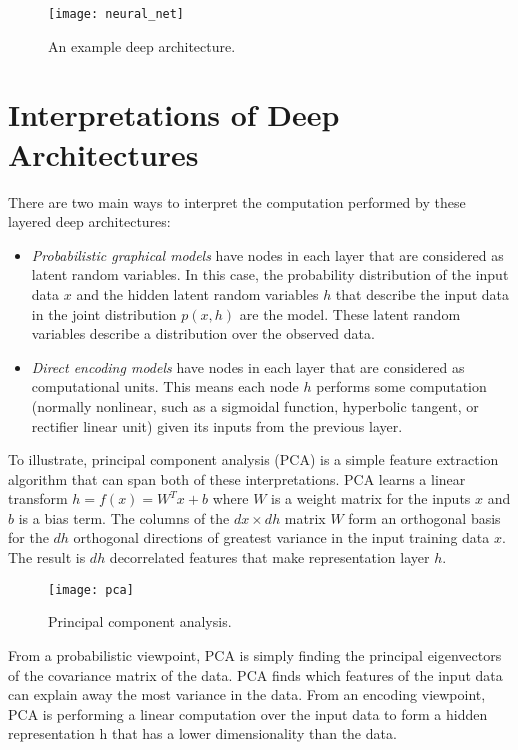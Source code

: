 \begin{figure}[h!]
  \centering
    \texttt{[image: neural\_net]}
\caption{An example deep architecture.}
\end{figure}

\section{Interpretations of Deep Architectures}
There are two main ways to interpret the computation performed by these layered deep architectures:

\begin{itemize}
\item \emph{Probabilistic graphical models} have nodes in each layer that are considered as latent random variables. In this case, the probability distribution of the input data \(x\) and the hidden latent random variables \(h\) that describe the input data in the joint distribution \(p(x,h)\) are the model. These latent random variables describe a distribution over the observed data.
\item \emph{Direct encoding models} have nodes in each layer that are considered as computational units. This means each node \(h\) performs some computation (normally nonlinear, such as a sigmoidal function, hyperbolic tangent, or rectifier linear unit) given its inputs from the previous layer.
\end{itemize}

To illustrate, principal component analysis (PCA) is a simple feature extraction algorithm that can span both of these interpretations. PCA learns a linear transform \(h = f(x) = W^T x + b\) where \(W\) is a weight matrix for the inputs \(x\) and \(b\) is a bias term. The columns of the \(dx \times dh\) matrix \(W\) form an orthogonal basis for the \(dh\) orthogonal directions of greatest variance in the input training data \(x\). The result is \(dh\) decorrelated features that make representation layer \(h\). 

\begin{figure}[h!]
  \centering
    \texttt{[image: pca]}
\caption[PCA]{Principal component analysis\footnotemark{}.}
\end{figure}

From a probabilistic viewpoint, PCA is simply finding the principal eigenvectors of the covariance matrix of the data. PCA finds which features of the input data can explain away the most variance in the data\cite{bach05}. From an encoding viewpoint, PCA is performing a linear computation over the input data to form a hidden representation h that has a lower dimensionality than the data.

